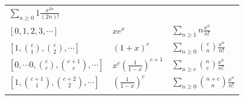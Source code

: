 \begin{longtable}[]{@{}lll@{}}
\begin{minipage}[t]{0.30\columnwidth}
\(\displaystyle\sum_{n \geq 0} 1\frac{x^{2n}}{(2n)!}\)\strut
\end{minipage}\tabularnewline
\begin{minipage}[t]{0.30\columnwidth}\raggedright
\([0, 1, 2, 3, \cdots]\)\strut
\end{minipage} & \begin{minipage}[t]{0.30\columnwidth}\raggedright
\(xe^x\)\strut
\end{minipage} & \begin{minipage}[t]{0.30\columnwidth}\raggedright
\(\displaystyle\sum_{n\geq 1}n \frac {x^n} {n!}\)\strut
\end{minipage}\tabularnewline
\begin{minipage}[t]{0.30\columnwidth}\raggedright
\([1,{c \choose 1}, {c \choose 2}, \cdots]\)\strut
\end{minipage} & \begin{minipage}[t]{0.30\columnwidth}\raggedright
\((1+x)^c\)\strut
\end{minipage} & \begin{minipage}[t]{0.30\columnwidth}\raggedright
\(\displaystyle\sum_{n\geq 0}{c \choose n}\frac {x^n} {n!}\)\strut
\end{minipage}\tabularnewline
\begin{minipage}[t]{0.30\columnwidth}\raggedright
\([0,\cdots 0, {c \choose c}, {c+1 \choose c}, \cdots]\)\strut
\end{minipage} & \begin{minipage}[t]{0.30\columnwidth}\raggedright
\(x^c \left(\frac{1}{1-x}\right)^{c+1}\)\strut
\end{minipage} & \begin{minipage}[t]{0.30\columnwidth}\raggedright
\(\displaystyle\sum_{n\geq c}{n \choose c}\frac {x^n} {n!}\)\strut
\end{minipage}\tabularnewline
\begin{minipage}[t]{0.30\columnwidth}\raggedright
\([1, {c+1 \choose 1}, {c+2 \choose 2}, \cdots]\)\strut
\end{minipage} & \begin{minipage}[t]{0.30\columnwidth}\raggedright
\(\left( \frac 1 {1-x} \right)^c\)\strut
\end{minipage} & \begin{minipage}[t]{0.30\columnwidth}\raggedright
\(\displaystyle\sum_{n \geq 0}{n+c \choose n} \frac {x^n} {n!}\)\strut
\end{minipage}\tabularnewline
\begin{minipage}[t]{0.30\columnwidth}\raggedright

\end{minipage}
\end{longtable}

